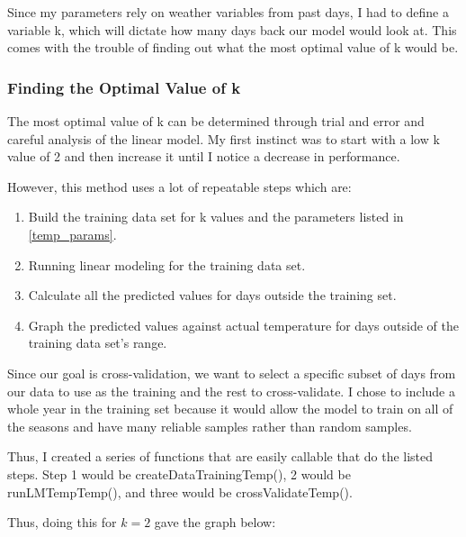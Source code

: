 \documentclass[12pt]{article}
\begin{document}
Since my parameters rely on weather variables from past days, I had to define a variable k, which will dictate how many days back our model would look at. This comes with the trouble of finding out what the most optimal value of k would be.

\subsubsection{Finding the Optimal Value of k} \label{finding}
The most optimal value of k can be determined through trial and error and careful analysis of the linear model. My first instinct was to start with a low k value of 2 and then increase it until I notice a decrease in performance.

However, this method uses a lot of repeatable steps which are:
\begin{enumerate}
  \item Build the training data set for k values and the parameters listed in \ref{temp_params}.
  \item Running linear modeling for the training data set.
  \item Calculate all the predicted values for days outside the training set.
  \item Graph the predicted values against actual temperature for days outside of the training data set's range.
\end{enumerate}

Since our goal is cross-validation, we want to select a specific subset of days from our data to use as the training and the rest to cross-validate. I chose to include a whole year in the training set because it would allow the model to train on all of the seasons and have many reliable samples rather than random samples.

Thus, I created a series of functions that are easily callable that do the listed steps. Step 1 would be createDataTrainingTemp(), 2 would be runLMTempTemp(), and three would be crossValidateTemp().

Thus, doing this for $k=2$ gave the graph below:
\end{document}
